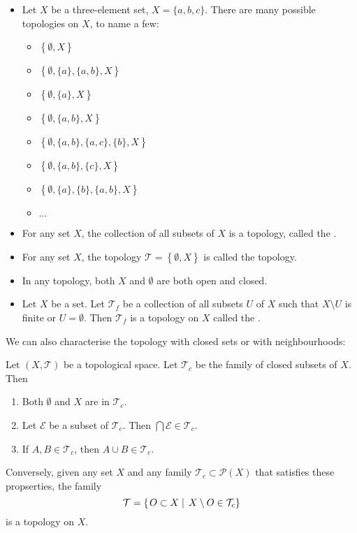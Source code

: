 \begin{example}
\begin{itemize}
\item Let $X$ be a three-element set, $X = \{a,b,c\}$. There are many possible topologies on $X$, to name a few:
\begin{itemize}
\item $\left\{\emptyset, X\right\}$
\item $\left\{\emptyset, \{a\}, \{a,b\}, X\right\}$
\item $\left\{\emptyset, \{a\}, X\right\}$
\item $\left\{\emptyset, \{a,b\}, X\right\}$
\item $\left\{\emptyset, \{a,b\}, \{a,c\}, \{b\}, X\right\}$
\item $\left\{\emptyset, \{a,b\}, \{c\}, X\right\}$
\item $\left\{\emptyset, \{a\}, \{b\}, \{a,b\}, X\right\}$
\item $\ldots$
\end{itemize}
\item For any set $X$, the collection of all subsets of $X$ is a topology, called the .
\item For any set $X$, the topology $\mathcal{T} = \left\{\emptyset, X\right\}$ is called the  topology.
\item In any topology, both $X$ and $\emptyset$ are both open and closed.
\item Let $X$ be a set. Let $\mathcal{T}_f$ be a collection of all subsets $U$ of $X$ such that $X\setminus U$ is finite or $U=\emptyset$. Then $\mathcal{T}_f$ is a topology on $X$ called the .
\end{itemize}
\end{example}

We can also characterise the topology with closed sets or with neighbourhoods:
\begin{proposition}
Let $(X,\mathcal{T})$ be a topological space. Let $\mathcal{T}_c$ be the family of closed subsets of $X$. Then
\begin{enumerate}
\item Both $\emptyset$ and $X$ are in $\mathcal{T}_c$.
\item Let $\mathcal{E}$ be a subset of $\mathcal{T}_c$. Then $\bigcap\mathcal{E}\in\mathcal{T}_c$.
\item If $A,B\in \mathcal{T}_c$, then $A\cup B\in \mathcal{T}_c$.
\end{enumerate}
Conversely, given any set $X$ and any family $\mathcal{T}_c\subset\mathcal{P}(X)$ that satisfies these propserties, the family
\[ \mathcal{T} = \left\{\left. O\subset X \;\right|\; X\setminus O\in\mathcal{T}_c \right\} \]
is a topology on $X$. 
\end{proposition}


